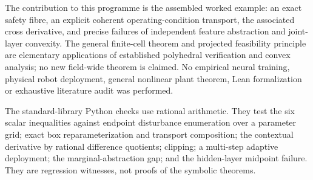 \documentclass[11pt]{article}
\begin{document}
The contribution to this programme is the assembled worked example: an exact safety fibre, an explicit coherent operating-condition transport, the associated cross derivative, and precise failures of independent feature abstraction and joint-layer convexity. The general finite-cell theorem and projected feasibility principle are elementary applications of established polyhedral verification and convex analysis; no new field-wide theorem is claimed. No empirical neural training, physical robot deployment, general nonlinear plant theorem, Lean formalization or exhaustive literature audit was performed.

The standard-library Python checks use rational arithmetic. They test the six scalar inequalities against endpoint disturbance enumeration over a parameter grid; exact box reparameterization and transport composition; the contextual derivative by rational difference quotients; clipping; a multi-step adaptive deployment; the marginal-abstraction gap; and the hidden-layer midpoint failure. They are regression witnesses, not proofs of the symbolic theorems.
\end{document}
